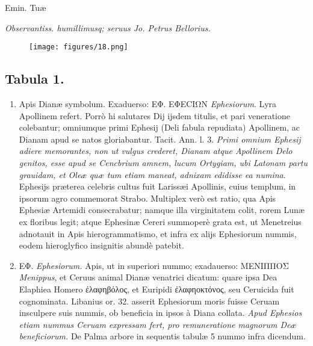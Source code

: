 \documentclass[a4paper, 11pt, oneside, polutonikogreek, latin]{article}
\begin{document}
Emin. Tuæ

\emph{Observantiss. humillimusq; seruus Jo. Petrus Bellorius.}
\clearpage
\vspace*{\fill}
\begin{figure}[H]
\centering
\texttt{[image: figures/18.png]}
\end{figure}
\vspace*{\fill}
\clearpage
\subsection*{Tabula 1.}
\begin{enumerate}
    \item Apis Dianæ symbolum. Exaduerso: EΦ. EΦECIΩN \emph{Ephesiorum}. Lyra Apollinem refert. Porrò hi salutares Dij ijsdem titulis, et pari veneratione colebantur; omniumque primi Ephesij (Deli fabula repudiata) Apollinem, ac Dianam apud se natos gloriabantur. Tacit. Ann. l. 3. \emph{Primi omnium Ephesij adiere memorantes, non ut vulgus crederet, Dianam atque Apollinem Delo genitos, esse apud se Cencbrium amnem, lucum Ortygiam, ubi Latonam partu grauidam, et Oleæ quæ tum etiam maneat, adnixam edidisse ea numina}. Ephesijs præterea celebris cultus fuit Larissæi Apollinis, cuius templum, in ipsorum agro commemorat Strabo. Multiplex verò est ratio, qua Apis Ephesiæ Artemidi consecrabatur; namque illa virginitatem colit, rorem Lunæ ex floribus legit; atque Ephesinæ Cereri summoperè grata est, ut Menetreius adnotauit in Apis hierogrammatismo, et infra ex alijs Ephesiorum nummis, eodem hieroglyfico insignitis abundè patebit.

    \item EΦ. \emph{Ephesiorum.} Apis, ut in superiori nummo; exadauerso: MENIΠΠOΣ \emph{Menippus}, et Ceruus animal Dianæ venatrici dicatum: quare ipsa Dea Elaphiea Homero ἐλαφηβόλος, et Euripidi ἐλαφηοκτόνος, seu Ceruicida fuit cognominata. Libanius or. 32. asserit Ephesiorum moris fuisse Ceruam insculpere suis nummis, ob beneficia in ipsos à Diana collata. \emph{Apud Ephesios etiam nummus Ceruam expressam fert, pro remuneratione magnorum Deæ beneficiorum.} De Palma arbore in sequentis tabulæ 5 nummo infra dicendum.


\end{enumerate}
\end{document}
